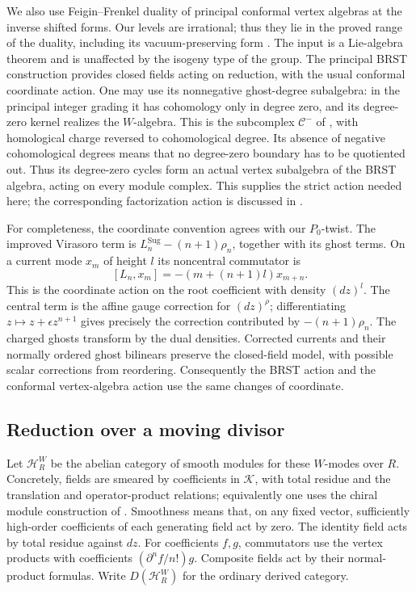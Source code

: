We also use Feigin--Frenkel duality of principal conformal vertex
algebras at the inverse shifted forms.  Our levels are irrational;
thus they lie in the proved range of the duality, including its
vacuum-preserving form \cite[Section~7.3, especially Warning~7.3.1
and Lemma~7.3.3]{RaskinW}.  The input is a Lie-algebra theorem and
is unaffected by the isogeny type of the group.  The principal BRST
construction provides closed fields acting on reduction, with the
usual conformal coordinate action.  One may use its nonnegative
ghost-degree subalgebra: in the principal integer grading it has
cohomology only in degree zero, and its degree-zero kernel realizes
the \(W\)-algebra.  This is the subcomplex \(\mathcal C^-\) of
\cite[Section~4, Theorem~4.1 and Remark~4.1]{KacWakimoto}, with
homological charge reversed to cohomological degree.  Its absence
of negative cohomological degrees means that no degree-zero boundary
has to be quotiented out.  Thus its degree-zero cycles form an actual
vertex subalgebra of the BRST algebra, acting on every module complex.
This supplies the strict action needed here; the corresponding
factorization action is discussed in \cite[Section~4.4]{RaskinW}.

For completeness, the coordinate convention agrees with our
\(P_0\)-twist.  The improved Virasoro term is
\(L_n^{\mathrm{Sug}}-(n+1)\rho_n\), together with its ghost terms.
On a current mode \(x_m\) of height \(l\) its noncentral commutator is
\[
 [L_n,x_m]=-(m+(n+1)l)x_{m+n}.
\]
This is the coordinate action on the root coefficient with density
\((dz)^l\).  The central term is the affine gauge correction for
\((dz)^\rho\); differentiating \(z\mapsto z+\epsilon z^{n+1}\)
gives precisely the correction contributed by \(-(n+1)\rho_n\).
The charged ghosts transform by the dual densities.  Corrected
currents and their normally ordered ghost bilinears preserve the
closed-field model, with possible scalar corrections from reordering.
Consequently the BRST action and the conformal vertex-algebra action
use the same changes of coordinate.

\subsection{Reduction over a moving divisor}

Let \(\mathcal H_R^W\) be the abelian category of smooth modules for
these \(W\)-modes over \(R\).  Concretely, fields are smeared by
coefficients in \(\mathcal K\), with total residue and the translation
and operator-product relations; equivalently one uses the chiral
module construction of \cite[Section~3.6]{BDChiral}.  Smoothness means
that, on any fixed vector, sufficiently high-order coefficients of each generating field
act by zero.  The identity field acts by total residue against \(dz\).
For coefficients \(f,g\), commutators use the vertex products with
coefficients \((\partial^n f/n!)g\).  Composite fields act by their
normal-product formulas.  Write \(D(\mathcal H_R^W)\) for the ordinary
derived category.

